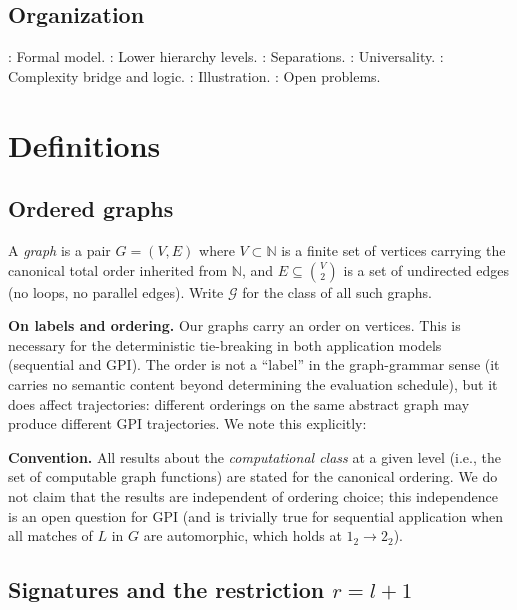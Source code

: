 \documentclass{../shared/primo}
\begin{document}
\subsection{Organization}

: Formal model. : Lower hierarchy levels. : Separations. : Universality. : Complexity bridge and logic. : Illustration. : Open problems.


\section{Definitions}
\label{sec:defs}

\subsection{Ordered graphs}

A \emph{graph} is a pair $G = (V, E)$ where $V \subset \mathbb{N}$ is a finite set of vertices carrying the canonical total order inherited from $\mathbb{N}$, and $E \subseteq \binom{V}{2}$ is a set of undirected edges (no loops, no parallel edges). Write $\mathcal{G}$ for the class of all such graphs.

\textbf{On labels and ordering.} Our graphs carry an order on vertices. This is necessary for the deterministic tie-breaking in both application models (sequential and GPI). The order is not a ``label'' in the graph-grammar sense (it carries no semantic content beyond determining the evaluation schedule), but it does affect trajectories: different orderings on the same abstract graph may produce different GPI trajectories. We note this explicitly:

\textbf{Convention.} All results about the \emph{computational class} at a given level (i.e., the set of computable graph functions) are stated for the canonical ordering. We do not claim that the results are independent of ordering choice; this independence is an open question for GPI (and is trivially true for sequential application when all matches of $L$ in $G$ are automorphic, which holds at $1_2 \to 2_2$).

\subsection{Signatures and the restriction \texorpdfstring{$r = l+1$}{r = l+1}}
\end{document}
